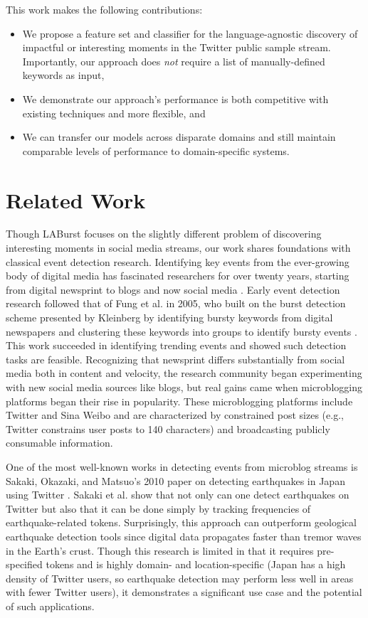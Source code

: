 \documentclass[letterpaper]{article}
\begin{document}
This work makes the following contributions:
%
\begin{itemize}
\item We propose a feature set and classifier for the language-agnostic discovery of impactful or interesting moments in the Twitter public sample stream. Importantly, our approach does {\it not} require a list of manually-defined keywords as input,

\item We demonstrate our approach's performance is both competitive with existing techniques and more flexible, and

\item We can transfer our models across disparate domains and still maintain comparable levels of performance to domain-specific systems.
\end{itemize}

\section{Related Work}
\label{sect:relatedWork}

Though LABurst focuses on the slightly different problem of discovering interesting moments in social media streams, our work shares foundations with classical event detection research.
Identifying key events from the ever-growing body of digital media has fascinated researchers for over twenty years, starting from digital newsprint to blogs and now social media \cite{allan1998line}.
Early event detection research followed that of Fung et al. in 2005, who built on the burst detection scheme presented by Kleinberg by identifying bursty keywords from digital newspapers and clustering these keywords into groups to identify bursty events \cite{Kleinberg:2002:BHS:775047.775061,Fung:2005:PFB:1083592.1083616}.
This work succeeded in identifying trending events and showed such detection tasks are feasible.
Recognizing that newsprint differs substantially from social media both in content and velocity, the research community began experimenting with new social media sources like blogs, but real gains came when microblogging platforms began their rise in popularity.
These microblogging platforms include Twitter and Sina Weibo and are characterized by constrained post sizes (e.g., Twitter constrains user posts to 140 characters) and broadcasting publicly consumable information.

One of the most well-known works in detecting events from microblog streams is Sakaki, Okazaki, and Matsuo's 2010 paper on detecting earthquakes in Japan using Twitter \cite{Sakaki:2010:EST:1772690.1772777}.
Sakaki et al. show that not only can one detect earthquakes on Twitter but also that it can be done simply by tracking frequencies of earthquake-related tokens.
Surprisingly, this approach can outperform geological earthquake detection tools since digital data propagates faster than tremor waves in the Earth's crust.
Though this research is limited in that it requires pre-specified tokens and is highly domain- and location-specific (Japan has a high density of Twitter users, so earthquake detection may perform less well in areas with fewer Twitter users), it demonstrates a significant use case and the potential of such applications.
\end{document}
